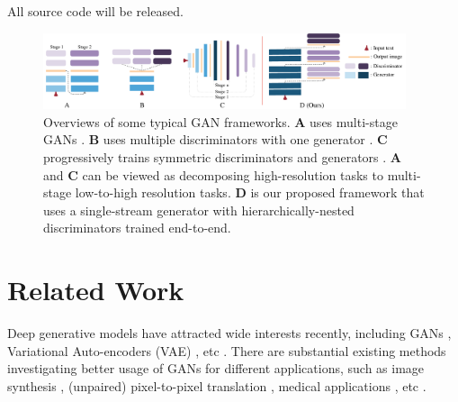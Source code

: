 \documentclass[10pt,twocolumn,letterpaper]{article}
\begin{document}
All source code will be released.


\begin{figure}[t]
    \centering
    \includegraphics[width=0.95\textwidth]{figure/views2.pdf}
    \vspace{-.2cm}
    \caption{Overviews of some typical GAN frameworks. \textbf{A} uses multi-stage GANs \cite{han2017stackgan,denton2015deep}. \textbf{B} uses multiple discriminators with one generator \cite{durugkar2016generative,tu_etal_nips17_d2gan}. \textbf{C} progressively trains symmetric discriminators and generators \cite{Karras2017progressive,huang2016stacked}. \textbf{A} and \textbf{C} can be viewed as decomposing high-resolution tasks to multi-stage low-to-high resolution tasks.  \textbf{D} is our proposed framework that uses a single-stream generator with hierarchically-nested discriminators trained end-to-end.} \label{fig:archs-review} \vspace{-.4cm}
\end{figure}


\section{Related Work}

Deep generative models have attracted wide interests recently, including GANs \cite{goodfellow2014generative}, Variational Auto-encoders (VAE) \cite{kingma2013auto}, etc \cite{oord2016pixel}. 
There are substantial existing methods investigating better usage of GANs for different applications, such as image synthesis \cite{radford2015unsupervised, shrivastava2016learning}, (unpaired) pixel-to-pixel translation \cite{isola2016image,zhu2017unpaired}, medical applications \cite{costa2017towards}, etc \cite{ledig2016photo,huang2016stacked}.
\end{document}

